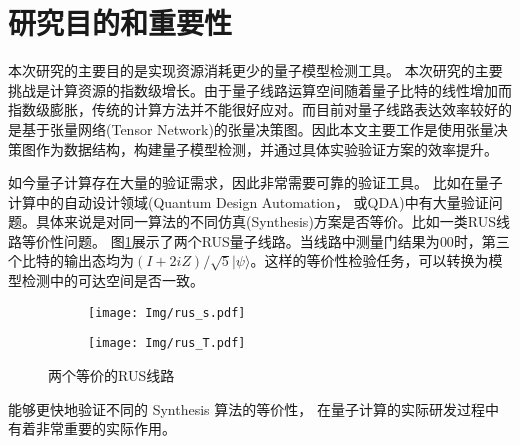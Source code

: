 \section{研究目的和重要性}
本次研究的主要目的是实现资源消耗更少的量子模型检测工具。
本次研究的主要挑战是计算资源的指数级增长。由于量子线路运算空间随着量子比特的线性增加而指数级膨胀，传统的计算方法并不能很好应对。而目前对量子线路表达效率较好的是基于张量网络(Tensor Network)的张量决策图。因此本文主要工作是使用张量决策图作为数据结构，构建量子模型检测，并通过具体实验验证方案的效率提升。


如今量子计算存在大量的验证需求，因此非常需要可靠的验证工具。
比如在量子计算中的自动设计领域(Quantum Design Automation， 或QDA)中有大量验证问题。具体来说是对同一算法的不同仿真(Synthesis)方案是否等价。比如一类RUS线路等价性问题。
图\ref{fig:rus-equal}展示了两个RUS量子线路。当线路中测量门结果为$00$时，第三个比特的输出态均为$\left(I+2iZ\right)/ \sqrt 5 |\psi\rangle$。这样的等价性检验任务，可以转换为模型检测中的可达空间是否一致。
\begin{figure}[!htbp]
	\centering
	\begin{subfigure}[b]{0.45\textwidth}
        \centering
        \texttt{[image: Img/rus\_s.pdf]}
	\end{subfigure}
	\qquad
	\begin{subfigure}[b]{0.45\textwidth}
        \centering
        \texttt{[image: Img/rus\_T.pdf]}
	\end{subfigure}
	\caption{两个等价的RUS线路\citep{Bocharov_2015}}
	\label{fig:rus-equal}
\end{figure}
能够更快地验证不同的 Synthesis 算法的等价性，
在量子计算的实际研发过程中有着非常重要的实际作用。

